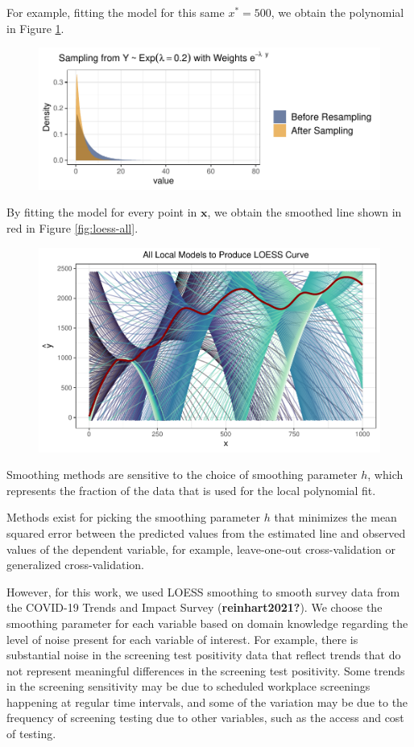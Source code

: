 \documentclass[12pt,twoside]{smiththesis}
\begin{document}
For example, fitting the model for this same \(x^*=500\), we obtain the polynomial in Figure \ref{fig:ex-poly}.
\begin{figure}
\centering
\includegraphics{thesis_files/figure-latex/unnamed-chunk-17-1.pdf}
\caption{\label{fig:unnamed-chunk-17}\label{fig:ex-poly}}
\end{figure}
By fitting the model for every point in \(\mathbf x\), we obtain the smoothed line shown in red in Figure \ref{fig:loess-all}.
\begin{figure}
\centering
\includegraphics{thesis_files/figure-latex/loess-all-1.pdf}
\caption{\label{fig:loess-all}\label{loess-all}}
\end{figure}
Smoothing methods are sensitive to the choice of smoothing parameter \(h\), which represents the fraction of the data that is used for the local polynomial fit.

Methods exist for picking the smoothing parameter \(h\) that minimizes the mean squared error between the predicted values from the estimated line and observed values of the dependent variable, for example, leave-one-out cross-validation or generalized cross-validation.

However, for this work, we used LOESS smoothing to smooth survey data from the COVID-19 Trends and Impact Survey (\textbf{reinhart2021?}).
We choose the smoothing parameter for each variable based on domain knowledge regarding the level of noise present for each variable of interest. For example, there is substantial noise in the screening test positivity data that reflect trends that do not represent meaningful differences in the screening test positivity. Some trends in the screening sensitivity may be due to scheduled workplace screenings happening at regular time intervals, and some of the variation may be due to the frequency of screening testing due to other variables, such as the access and cost of testing.
\end{document}
